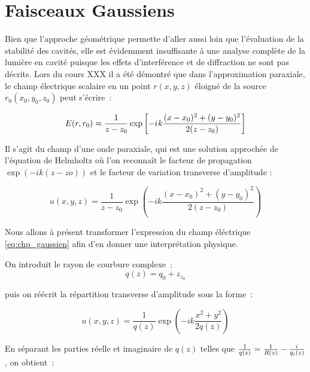 \documentclass[a4paper]{book}
\newcommand{\iu}{{i\mkern1mu}}
\begin{document}
\chapter{Faisceaux Gaussiens}

Bien que l'approche géométrique permette d'aller aussi loin que l'évaluation de la stabilité des cavités, elle est évidemment insuffisante à une analyse complète de la lumière en cavité puisque les effets d'interférence et de diffraction ne sont pas décrits. Lors du cours XXX il a été démontré que dans l'approximation paraxiale, le champ électrique scalaire en un point $r(x, y, z)$ éloigné de la source $r_0(x_0, y_0, z_0)$ peut s'écrire~: 

\begin{equation}
    E(r,r_0) = \frac{1}{z-z_0}\exp\left[-\iu k\frac{(x - x_0)^2+(y - y_0)^2}{2(z - z_0)}\right]
    \label{eq:chp_gaussien}
\end{equation}


Il s'agit du champ d'une onde paraxiale, qui est une solution approchée de l'équation de Helmholtz où l'on reconnaît le facteur de propagation $\exp(-ik(z-zo))$ et le facteur de variation transverse d'amplitude :

\begin{equation}
    u(x, y, z) = \frac{1}{z-z_0}\exp\left(-ik\frac{(x-x_0)^2+(y-y_0)^2}{2(z-z_0)}\right)
\end{equation}

Nous allons à présent transformer l'expression du champ éléctrique \ref{eq:chp_gaussien} afin d'en donner une interprétation physique. 

On introduit le rayon de courbure complexe~: 
\begin{equation}
    q(z)=q_0+z_z_0
\end{equation}

puis on réécrit la répartition transverse d'amplitude sous la forme~: 

\begin{equation}
    u(x, y, z) = \frac{1}{q(z)}\exp\left(-ik\frac{x^2+y^2}{2q(z)}\right)
\end{equation}

En séparant les parties réelle et imaginaire de $q(z)$ telles que $\frac{1}{q(z)}=\frac{1}{R(z)}-\frac{\iu}{q_i(z)}$, on obtient~:
\end{document}
